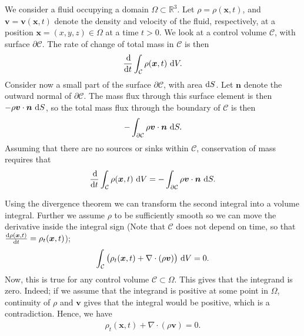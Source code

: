 \documentclass[11pt]{article}
\begin{document}
We consider a fluid occupying a domain $\Omega \subset \mathbb{R}^3$. Let $\rho = \rho(\bm{x}, t)$, and
$\bm{v} = \bm{v}(\bm{x},t)$ denote the density and velocity of the fluid, respectively, at a position
$\bm{x} = (x,y,z) \in \Omega$ at a time $t > 0$. We look at a control volume $\mathcal{C}$, with surface $\partial \mathcal{C}$.
The rate of change of total mass in $\mathcal{C}$ is then
\begin{align*}
    \frac{\operatorname{d}\!}{\operatorname{d}\! t}\int_\mathcal{C} \rho(\bm{x},t) \, \operatorname{d}\! V.
\end{align*}
Consider now a small part of the surface $\partial \mathcal{C}$, with area $\operatorname{d}\! S$. Let $\bm{n}$ denote the outward normal
of $\partial \mathcal{C}$. The mass flux through this surface element is then $-\rho \bm{v} \cdot \bm{n} \, \operatorname{d}\! S$, so the
total mass flux through the boundary of $\mathcal{C}$ is then
\begin{align*}
    -\int_{\partial \mathcal{C}}\rho \bm{v} \cdot \bm{n} \, \operatorname{d}\! S.
\end{align*}
Assuming that there are no sources or sinks within $\mathcal{C}$, conservation of mass requires that
\begin{align*}
    \frac{\operatorname{d}\!}{\operatorname{d}\! t}\int_\mathcal{C} \rho(\bm{x},t) \, \operatorname{d}\! V
                            = -\int_{\partial \mathcal{C}}\rho \bm{v} \cdot \bm{n} \, \operatorname{d}\! S.
\end{align*}

Using the divergence theorem we can transform the second integral into
a volume integral. Further we assume $\rho$ to be sufficiently smooth
so we can move the derivative inside the integral sign (Note that
$\mathcal{C}$ does not depend on time, so that $\frac{\operatorname{d}\! \rho(\bm x,t)}{\operatorname{d}\!
  t}= \rho_t(\bm x, t)$);
\begin{align*}
    \int_\mathcal{C} \big(\rho_t(\bm{x},t) + \nabla \cdot (\rho \bm{v}) \big) \, \operatorname{d}\! V = 0.
\end{align*}
Now, this is true for any control volume $\mathcal{C} \subset \Omega$. This gives that the integrand is zero. Indeed;
if we assume that the integrand is positive at some point in $\Omega$, continuity of $\rho$ and $\bm{v}$
gives that the integral would be positive, which is a contradiction. Hence, we have
\begin{align}
    \label{eq:massConservation}
    \rho_t(\bm{x},t) + \nabla \cdot (\rho \bm{v}) = 0.
\end{align}
%
%
\end{document}
